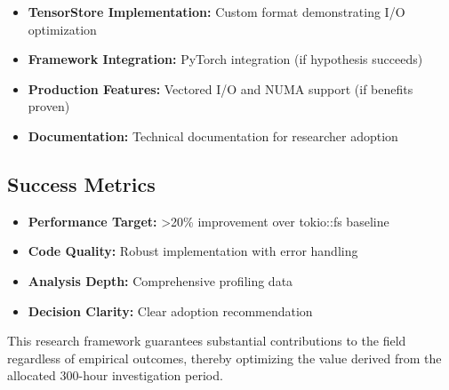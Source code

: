 \documentclass{article}
\begin{document}
\begin{itemize}
\item \textbf{TensorStore Implementation:} Custom format demonstrating I/O optimization
\item \textbf{Framework Integration:} PyTorch integration (if hypothesis succeeds)
\item \textbf{Production Features:} Vectored I/O and NUMA support (if benefits proven)
\item \textbf{Documentation:} Technical documentation for researcher adoption
\end{itemize}

\subsection{Success Metrics}

\begin{itemize}
\item \textbf{Performance Target:} >20\% improvement over tokio::fs baseline
\item \textbf{Code Quality:} Robust implementation with error handling
\item \textbf{Analysis Depth:} Comprehensive profiling data
\item \textbf{Decision Clarity:} Clear adoption recommendation
\end{itemize}

This research framework guarantees substantial contributions to the field regardless of empirical outcomes, thereby optimizing the value derived from the allocated 300-hour investigation period.
\end{document}
